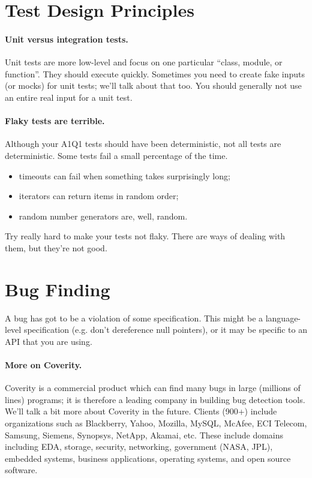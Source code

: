 \documentclass[11pt]{article}
\begin{document}
\section*{Test Design Principles}

\paragraph{Unit versus integration tests.} Unit tests are more low-level and focus on 
one particular ``class, module, or function''. They should execute quickly. Sometimes you 
need to create fake inputs (or mocks) for unit tests; we'll talk about that too. You should generally
not use an entire real input for a unit test.

\paragraph{Flaky tests are terrible.} Although your A1Q1 tests should have been 
deterministic, not all tests are deterministic. Some tests fail a small percentage
of the time. 
\begin{itemize}[noitemsep]
\item timeouts can fail when something takes surprisingly long;
\item iterators can return items in random order;
\item random number generators are, well, random.
\end{itemize}
Try really hard to make your tests not flaky. There are ways of dealing with them,
but they're not good.

\section*{Bug Finding}

A bug has got to be a violation of some specification. This might be
a language-level specification (e.g. don't dereference null pointers), or it
may be specific to an API that you are using.

\paragraph{More on Coverity.}
Coverity is a commercial product
which can find many bugs in large (millions of lines) programs; it is
therefore a leading company in building bug detection tools.
We'll talk a bit more about Coverity in the future. Clients
(900+) include organizations such as Blackberry, Yahoo, Mozilla,
MySQL, McAfee, ECI Telecom, Samsung, Siemens, Synopsys, NetApp,
Akamai, etc. These include domains including EDA, storage, security,
networking, government (NASA, JPL), embedded systems, business
applications, operating systems, and open source software.
\end{document}
